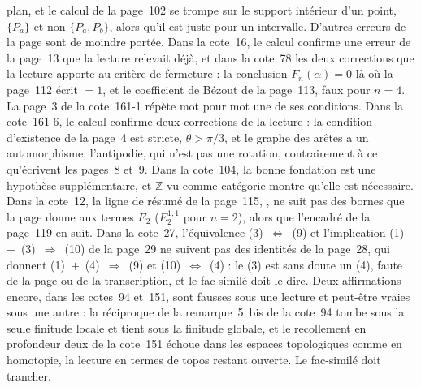 plan, et le calcul de la page~102 se trompe sur le support intérieur d'un point, $\{P_a\}$ et non $\{P_a, P_b\}$, alors qu'il est juste pour un intervalle. D'autres erreurs de la page sont de moindre portée. Dans la cote~16, le calcul confirme une erreur de la page~13 que la lecture relevait déjà, et dans la cote~78 les deux corrections que la lecture apporte au critère de fermeture : la conclusion $F_n(\alpha) = 0$ là où la page~112 écrit $= 1$, et le coefficient de Bézout de la page~113, faux pour $n = 4$. La page~3 de la cote~161-1 répète mot pour mot une de ses conditions. Dans la cote~161-6, le calcul confirme deux corrections de la lecture : la condition d'existence de la page~4 est stricte, $\theta > \pi/3$, et le graphe des arêtes a un automorphisme, l'antipodie, qui n'est pas une rotation, contrairement à ce qu'écrivent les pages~8 et~9. Dans la cote~104, la bonne fondation est une hypothèse supplémentaire, et $\mathbb Z$ vu comme catégorie montre qu'elle est nécessaire. Dans la cote~12, la ligne de résumé de la page~115, , ne suit pas des bornes que la page donne aux termes $E_2$ ($E_2^{1,1}$ pour $n = 2$), alors que l'encadré de la page~119 en suit. Dans la cote~27, l'équivalence (3)~$\Leftrightarrow$~(9) et l'implication (1)~$+$~(3)~$\Rightarrow$~(10) de la page~29 ne suivent pas des identités de la page~28, qui donnent (1)~$+$~(4)~$\Rightarrow$~(9) et (10)~$\Leftrightarrow$~(4) : le (3) est sans doute un (4), faute de la page ou de la transcription, et le fac-similé doit le dire. Deux affirmations encore, dans les cotes~94 et~151, sont fausses sous une lecture et peut-être vraies sous une autre : la réciproque de la remarque~5~bis de la cote~94 tombe sous la seule finitude locale et tient sous la finitude globale, et le recollement en profondeur deux de la cote~151 échoue dans les espaces topologiques comme en homotopie, la lecture en termes de topos restant ouverte. Le fac-similé doit trancher.

